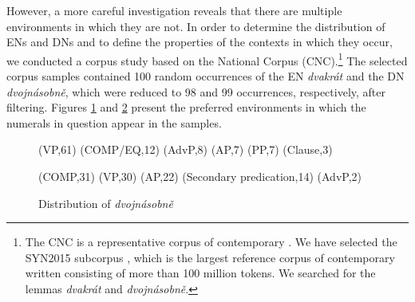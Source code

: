 \documentclass[output=paper,modfonts,hidelinks,newtxmath
\ChapterDOI{10.5281/zenodo.2545513}
]{langscibook}
\begin{document}
\noindent However, a more careful investigation reveals that there are multiple environments in which they are not. In order to determine the distribution of ENs and DNs and to define the properties of the contexts in which they occur, we conducted a corpus study based on the  National Corpus (CNC).\footnote{The CNC is a representative corpus of contemporary . We have selected the SYN2015 subcorpus \citep{kren-etal2015}, which is the largest reference corpus of contemporary written  consisting of more than 100 million tokens. We searched for the lemmas \textit{dvakrát} and \textit{dvojnásobně}.} The selected corpus samples contained 100 random occurrences of the EN \textit{dvakrát} and the DN \textit{dvojnásobně}, which were reduced to 98 and 99 occurrences, respectively, after filtering. Figures \ref{fig:distr_dvakrat} and \ref{fig:distr_dvojnasobne} present the preferred environments in which the numerals in question appear in the samples.

\begin{figure}[t]
\label{fig:distr_dvakrat}

\footnotesize
{}%
{
(VP,61)
(COMP/EQ,12)
(AdvP,8)
(AP,7)
(PP,7)
(Clause,3)
}
\end{figure}

\normalsize
\begin{figure}
\caption{Distribution of \textit{dvojnásobně}}
\footnotesize
\label{fig:distr_dvojnasobne}
%
{
(COMP,31)
(VP,30)
(AP,22)
(Secondary predication,14)
(AdvP,2)
}
\end{figure}
\normalsize

\end{document}
